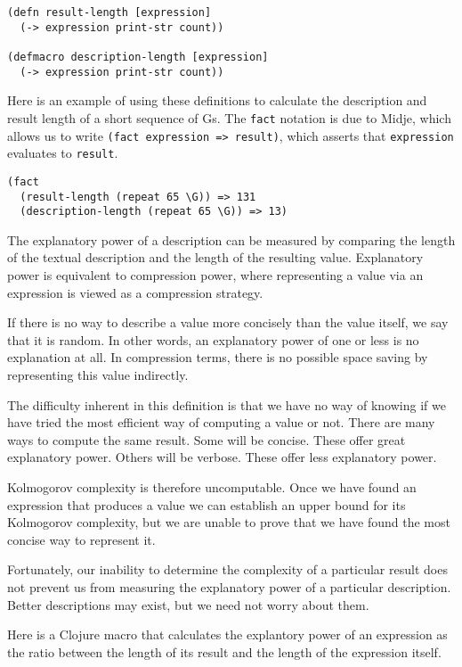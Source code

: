 \documentclass[numbers]{sigplanconf}
\begin{document}
\begin{verbatim}
(defn result-length [expression]
  (-> expression print-str count))

(defmacro description-length [expression]
  (-> expression print-str count))
\end{verbatim}

Here is an example of using these definitions to calculate the description and result length of a short sequence of Gs.
The \verb|fact| notation is due to Midje, which allows us to write \verb|(fact expression => result)|,
which asserts that \verb|expression| evaluates to \verb|result|.

\begin{verbatim}
(fact
  (result-length (repeat 65 \G)) => 131
  (description-length (repeat 65 \G)) => 13)
\end{verbatim}

The explanatory power of a description can be measured by comparing the length of the textual description and the length
of the resulting value. Explanatory power is equivalent to compression power, where representing a value via an
expression is viewed as a compression strategy.

If there is no way to describe a value more concisely than the value itself, we say that it is random. In other words, an
explanatory power of one or less is no explanation at all. In compression terms, there is no possible space saving
by representing this value indirectly.

The difficulty inherent in this definition is that we have no way of knowing if we have tried the most efficient way of
computing a value or not. There are many ways to compute the same result. Some will be concise. These offer great
explanatory power. Others will be verbose. These offer less explanatory power.

Kolmogorov complexity is therefore uncomputable. Once we have found an expression that produces a value we can establish
an upper bound for its Kolmogorov complexity, but we are unable to prove that we have found the most concise way to
represent it.

Fortunately, our inability to determine the complexity of a particular result does not prevent us from measuring the
explanatory power of a particular description. Better descriptions may exist, but we need not worry about them.

Here is a Clojure macro that calculates the explantory power of an expression as the ratio between the length of its
result and the length of the expression itself.
\end{document}
